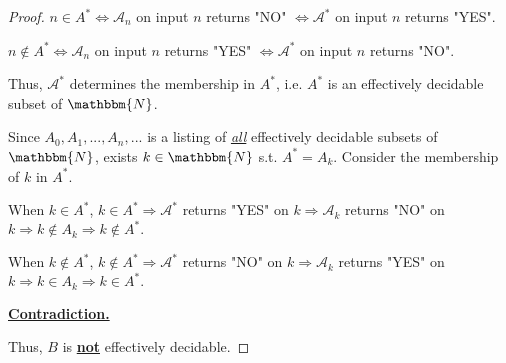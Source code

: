 \documentclass{article}
\begin{document}
\begin{proof}
    \vspace{-1.5em}\hspace{6em}
    $n\in A^*\Leftrightarrow \mathcal{A}_n$ on input $n$ returns "NO" $\Leftrightarrow \mathcal{A}^*$ on input $n$ returns "YES".

    \hspace{6em}
    $n\notin A^*\Leftrightarrow \mathcal{A}_n$ on input $n$ returns "YES" $\Leftrightarrow \mathcal{A}^*$ on input $n$ returns "NO".

    \hspace{1.3em}
    Thus, $\mathcal{A}^*$ determines the membership in $A^*$, i.e. $A^*$ is an effectively decidable subset of $\mathbbm{N}$.

    \hspace{1.3em}
    Since $A_0,A_1,...,A_n,...$ is a listing of \underline{\textit{all}} effectively decidable subsets of $\mathbbm{N}$, exists $k\in\mathbbm{N}$ s.t. $A^*=A_k$. Consider the membership of $k$ in $A^*$.

    \hspace{1.3em}
    When $k\in A^*$, $k\in A^*\Rightarrow\mathcal{A}^*$ returns "YES" on $k\Rightarrow\mathcal{A}_k$ returns "NO" on $k\Rightarrow k\notin A_k\Rightarrow k\notin A^*.$

    \hspace{1.3em}
    When $k\notin A^*$, 
    $k\notin A^*\Rightarrow\mathcal{A}^*$ returns "NO" on $k\Rightarrow\mathcal{A}_k$ returns "YES" on $k\Rightarrow k\in A_k\Rightarrow k\in A^*.$
    
    \hspace{1.3em}
    \underline{\textbf{Contradiction.}}
    
    \hspace{1.3em}
    Thus, $B$ is \underline{\textbf{not}} effectively decidable.
\end{proof}
\end{document}
